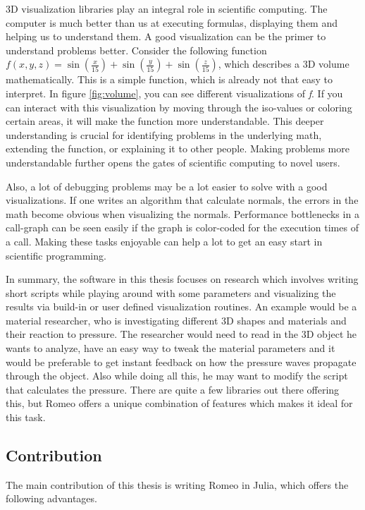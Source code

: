 3D visualization libraries play an integral role in scientific computing.
The computer is much better than us at executing formulas, displaying them and helping us to understand them.
A good visualization can be the primer to understand problems better.
Consider the following function $f(x,y,z)=\sin(\frac{x}{15})+\sin(\frac{y}{15})+\sin(\frac{z}{15})$, which describes a 3D volume mathematically. 
This is a simple function, which is already not that easy to interpret. In figure \ref{fig:volume}, you can see different visualizations of \textit{f}.
If you can interact with this visualization by moving through the iso-values or coloring certain areas, it will make the function more understandable.
This deeper understanding is crucial for identifying problems in the underlying math, extending the function, or explaining it to other people. 
Making problems more understandable further opens the gates of scientific computing to novel users.

Also, a lot of debugging problems may be a lot easier to solve with a good visualizations. 
If one writes an algorithm that calculate normals, the errors in the math become obvious when visualizing the normals.
Performance bottlenecks in a call-graph can be seen easily if the graph is color-coded for the execution times of a call. 
Making these tasks enjoyable can help a lot to get an easy start in scientific programming.


In summary, the software in this thesis focuses on research which involves writing short scripts while playing around with some parameters and visualizing the results via build-in or user defined visualization routines.
An example would be a material researcher, who is investigating different 3D shapes and materials and their reaction to pressure.
The researcher would need to read in the 3D object he wants to analyze, have an easy way to tweak the material parameters and it would be preferable to get instant feedback on how the pressure waves propagate through the object. Also while doing all this, he may want to modify the script that calculates the pressure.
There are quite a few libraries out there offering this, but Romeo offers a unique combination of features which makes it ideal for this task.

\subsection{Contribution}

The main contribution of this thesis is writing Romeo in Julia, which offers the following advantages.

